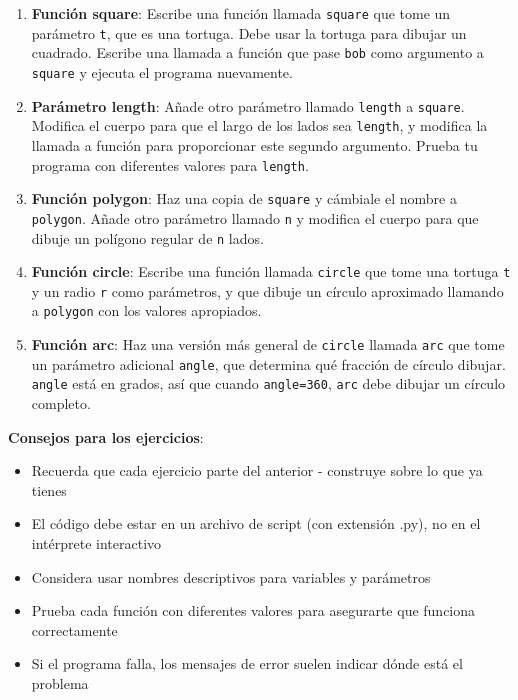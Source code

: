 \begin{enumerate}
\item \textbf{Función square}: Escribe una función llamada \texttt{square} que tome un parámetro \texttt{t}, que es una tortuga. Debe usar la tortuga para dibujar un cuadrado. Escribe una llamada a función que pase \texttt{bob} como argumento a \texttt{square} y ejecuta el programa nuevamente.



\item \textbf{Parámetro length}: Añade otro parámetro llamado \texttt{length} a \texttt{square}. Modifica el cuerpo para que el largo de los lados sea \texttt{length}, y modifica la llamada a función para proporcionar este segundo argumento. Prueba tu programa con diferentes valores para \texttt{length}.



\item \textbf{Función polygon}: Haz una copia de \texttt{square} y cámbiale el nombre a \texttt{polygon}. Añade otro parámetro llamado \texttt{n} y modifica el cuerpo para que dibuje un polígono regular de \texttt{n} lados.



\item \textbf{Función circle}: Escribe una función llamada \texttt{circle} que tome una tortuga \texttt{t} y un radio \texttt{r} como parámetros, y que dibuje un círculo aproximado llamando a \texttt{polygon} con los valores apropiados.



\item \textbf{Función arc}: Haz una versión más general de \texttt{circle} llamada \texttt{arc} que tome un parámetro adicional \texttt{angle}, que determina qué fracción de círculo dibujar. \texttt{angle} está en grados, así que cuando \texttt{angle=360}, \texttt{arc} debe dibujar un círculo completo.


\end{enumerate}

\textbf{Consejos para los ejercicios}:
\begin{itemize}
\item Recuerda que cada ejercicio parte del anterior - construye sobre lo que ya tienes
\item El código debe estar en un archivo de script (con extensión .py), no en el intérprete interactivo
\item Considera usar nombres descriptivos para variables y parámetros
\item Prueba cada función con diferentes valores para asegurarte que funciona correctamente
\item Si el programa falla, los mensajes de error suelen indicar dónde está el problema
\end{itemize}

